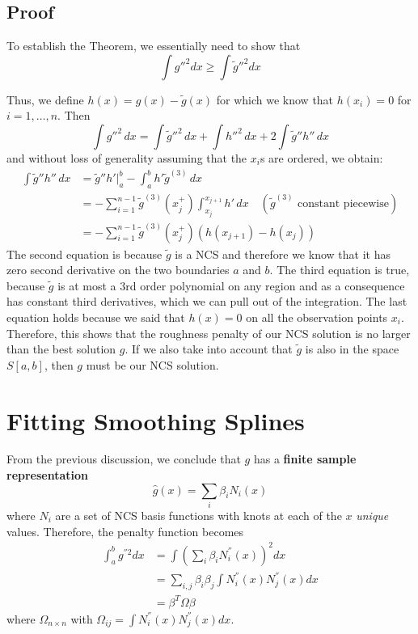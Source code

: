\documentclass[
]{book}
\begin{document}
\subsection{Proof}\label{proof}

To establish the Theorem, we essentially need to show that
\[\int g''^{2} dx \geq \int  \tilde{g}''^{2} dx\]

Thus, we define \(h(x) = g(x) - \tilde{g}(x)\) for which we know that \(h(x_i)=0\) for \(i=1, \ldots, n\). Then
\[ \int g''^2 \, dx  = \int \tilde{g}''^2 \, dx  + \int h''^2 \, dx  + 2 \int \tilde{g}'' h'' \, dx
\]
and without loss of generality assuming that the \(x_i\)s are ordered, we obtain:
\begin{align*}
\int \tilde{g}'' h'' \, dx  &= \tilde{g}'' h' \Big|_a^b 
- \int_a^b h' \tilde{g}^{(3)} \, dx\\
&= - \sum_{i=1}^{n-1} \tilde{g}^{(3)}\!\left(x_j^+\right) 
\int_{x_j}^{x_{j+1}} h' \, dx 
\quad (\tilde{g}^{(3)} \text{ constant piecewise})\\
&= - \sum_{i=1}^{n-1} \tilde{g}^{(3)}\!\left(x_j^+\right) 
\left(h(x_{j+1}) - h(x_j)\right)
\end{align*}
The second equation is because \(\tilde{g}\) is a NCS and therefore we know that it has zero second derivative on the two boundaries \(a\) and \(b\). The third equation is true, because \(\tilde{g}\) is at most a 3rd order polynomial on any region and as a consequence has constant third derivatives, which we can pull out of the integration. The last equation holds because we said that \(h(x)=0\) on all the observation points \(x_i\). Therefore, this shows that the roughness penalty of our NCS solution is no larger than the best solution \(g\). If we also take into account that \(\tilde{g}\) is also in the space \(S[a,b]\), then \(g\) must be our NCS solution.

\section{Fitting Smoothing Splines}\label{fitting-smoothing-splines}

From the previous discussion, we conclude that \(g\) has a \textbf{finite sample representation}
\[\hat{g}(x) = \sum_i \beta_i N_i(x)\]
where \(N_i\) are a set of NCS basis functions with knots at each of the \(x\) \emph{unique} values. Therefore, the penalty function becomes
\begin{align*}
\int_{a}^{b} g^{''2} dx &= \int  \left( \sum_i \beta_i N_i^{''}(x)\right)^2 dx\\
&= \sum_{i,j} \beta_i \beta_j \int N_i^{''}(x) N_j^{''}(x) dx\\
&=\beta^T \Omega \beta
\end{align*}
where \(\Omega_{n\times n}\) with \(\Omega_{ij} = \int N^{''}_{i}(x) N^{''}_{j}(x) dx\).
\end{document}
